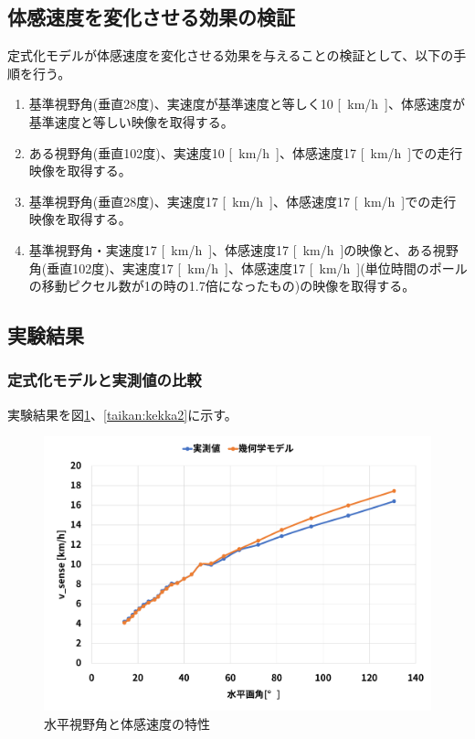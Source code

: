 \subsection{体感速度を変化させる効果の検証}
定式化モデルが体感速度を変化させる効果を与えることの検証として、以下の手順を行う。
\begin{enumerate}
  \item 基準視野角(垂直28度)、実速度が基準速度と等しく10 \si{[km/h]}、体感速度が基準速度と等しい映像を取得する。
  \item ある視野角(垂直102度)、実速度10 \si{[km/h]}、体感速度17 \si{[km/h]}での走行映像を取得する。
  \item 基準視野角(垂直28度)、実速度17 \si{[km/h]}、体感速度17 \si{[km/h]}での走行映像を取得する。
  \item 基準視野角・実速度17 \si{[km/h]}、体感速度17 \si{[km/h]}の映像と、ある視野角(垂直102度)、実速度17 \si{[km/h]}、体感速度17 \si{[km/h]}(単位時間のポールの移動ピクセル数が1の時の1.7倍になったもの)の映像を取得する。
\end{enumerate}

\subsection{実験結果}

\subsubsection{定式化モデルと実測値の比較}
実験結果を図\ref{taikan:kekka1}、\ref{taikan:kekka2}に示す。

\begin{figure}[h]
  \begin{center}
  \includegraphics[width=.85\linewidth]{img/19.pdf}
  \caption{水平視野角と体感速度の特性}
  \label{taikan:kekka1}
  \end{center}
\end{figure}

